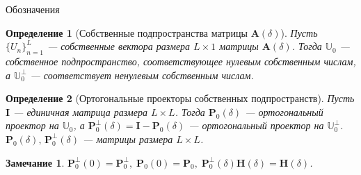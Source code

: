 \documentclass[notheorems, handout]{beamer}
\newtheorem{remark}{Замечание}
\newtheorem{definition}{Определение}
\begin{document}
	\begin{frame}{Обозначения}
		\begin{definition}[Собственные подпространства матрицы $\mathbf{A}(\delta)$]
			Пусть $\{U_n\}_{n=1}^L$ --- собственные вектора размера $L\times 1$ матрицы $\mathbf{A}(\delta)$. Тогда $\mathbb{U}_0$ --- собственное подпространство, соответствующее \emph{нулевым} собственным числам, а $\mathbb{U}_0^\bot$ --- соответствует \emph{ненулевым} собственным числам.
		\end{definition}
		\begin{definition}[Ортогональные проекторы собственных подпространств]
			Пусть $\mathbf{I}$ --- единичная матрица размера $L\times L$. Тогда $\mathbf{P}_0(\delta)$ --- ортогональный проектор на $\mathbb{U}_0$, а $\mathbf{P}_0^\bot(\delta) = \mathbf{I} - \mathbf{P}_0(\delta)$ --- ортогональный проектор на $\mathbb{U}_0^\bot$. $\mathbf{P}_0(\delta),\,\mathbf{P}_0^\bot(\delta)$ --- матрицы размера $L\times L$.
		\end{definition}
		\begin{remark}
			$\mathbf{P}_0^\bot(0) = \mathbf{P}_0^\bot,\;\mathbf{P}_0(0)=\mathbf{P}_0,\;\mathbf{P}_0^\bot(\delta)\mathbf{H}(\delta)=\mathbf{H}(\delta)$.
		\end{remark}
	\end{frame}
\end{document}
